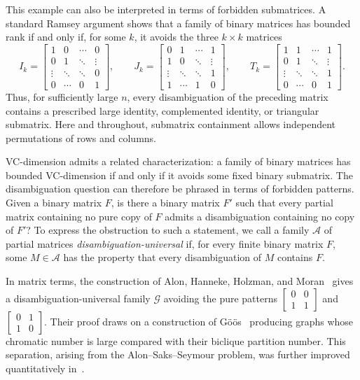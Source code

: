\documentclass[11pt]{article}
\theoremstyle{remark}
\begin{document}
This example can also be interpreted in terms of forbidden submatrices.
A standard Ramsey argument shows that a family of binary matrices has bounded rank if and only if, for some $k$, it avoids the three $k \times k$ matrices \[I_k=
\begin{bmatrix}
1 & 0 & \cdots & 0\\
0 & 1 & \ddots & \vdots\\
\vdots & \ddots & \ddots & 0\\
0 & \cdots & 0 & 1
\end{bmatrix},
\qquad
J_k=
\begin{bmatrix}
0 & 1 & \cdots & 1\\
1 & 0 & \ddots & \vdots\\
\vdots & \ddots & \ddots & 1\\
1 & \cdots & 1 & 0
\end{bmatrix},
\qquad 
T_k=
\begin{bmatrix}
1 & 1 & \cdots & 1\\
0 & 1 & \ddots & \vdots\\
\vdots & \ddots & \ddots & 1\\
0 & \cdots & 0 & 1
\end{bmatrix}.\] 
Thus, for sufficiently large $n$, every disambiguation of the preceding matrix contains a prescribed large identity, complemented identity, or triangular submatrix.
Here and throughout, submatrix containment allows independent permutations of rows and columns.

VC-dimension admits a related characterization: a family of binary matrices has bounded VC-dimension if and only if it avoids some fixed binary submatrix.
The disambiguation question can therefore be phrased in terms of forbidden patterns.
Given a binary matrix $F$, is there a binary matrix $F'$ such that every partial matrix containing no pure copy of $F$ admits a disambiguation containing no copy of $F'$?
To express the obstruction to such a statement, we call a family $\mathcal A$ of partial matrices \emph{disambiguation-universal} if, for every finite binary matrix $F$, some $M\in\mathcal A$ has the property that every disambiguation of $M$ contains $F$.

In matrix terms, the construction of Alon, Hanneke, Holzman, and Moran~\cite{AHHM22} gives a disambiguation-universal family $\mathcal G$ avoiding the pure patterns $
\begin{bmatrix}
0&0\\
1&1
\end{bmatrix}$ and $
\begin{bmatrix}
0&1\\
1&0
\end{bmatrix}$.
Their proof draws on a construction of G\"o\"os~\cite{Goos15} producing graphs whose chromatic number is large compared with their biclique partition number.
This separation, arising from the Alon--Saks--Seymour problem, was further improved quantitatively in~\cite{BBGJK21,Pabbaraju26}.
\end{document}
